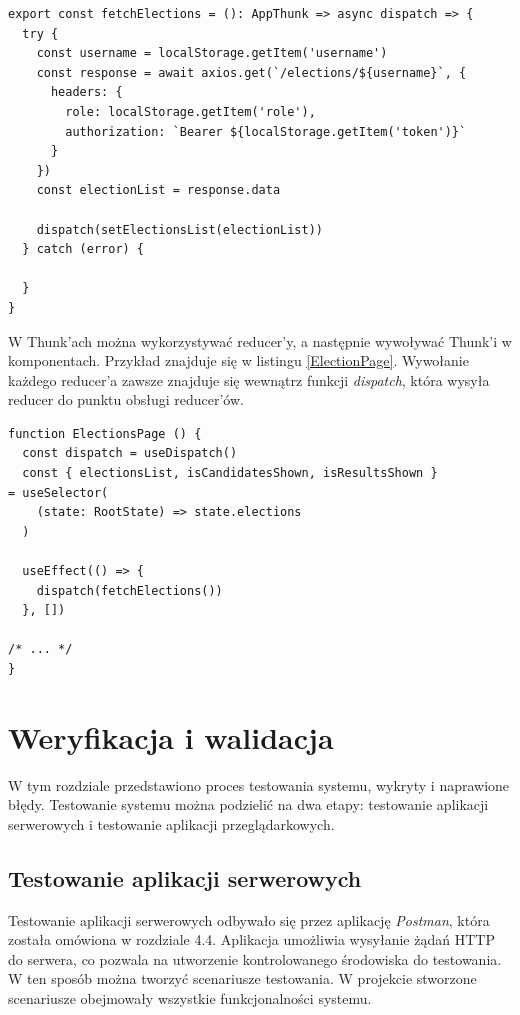\documentclass[a4paper,12pt]{book}
\begin{document}
\begin{lstlisting}[style=ES6, caption={Thunk \textit{fetchElection}.}, label={fetch}]
export const fetchElections = (): AppThunk => async dispatch => {
  try {
    const username = localStorage.getItem('username')
    const response = await axios.get(`/elections/${username}`, {
      headers: {
        role: localStorage.getItem('role'),
        authorization: `Bearer ${localStorage.getItem('token')}`
      }
    })
    const electionList = response.data

    dispatch(setElectionsList(electionList))
  } catch (error) {

  }
}
\end{lstlisting}

 W Thunk'ach można wykorzystywać reducer'y, a następnie wywoływać Thunk'i w komponentach. Przykład znajduje się w listingu \ref{ElectionPage}. Wywołanie każdego reducer'a zawsze znajduje się wewnątrz funkcji \textit{dispatch}, która wysyła reducer do punktu obsługi reducer'ów.

\begin{lstlisting}[style=ES6, caption={Wykorzystanie Thunk'a, w komponencie \textit{ElectionsPage}.}, label={ElectionPage}]
function ElectionsPage () {
  const dispatch = useDispatch()
  const { electionsList, isCandidatesShown, isResultsShown } 
= useSelector(
    (state: RootState) => state.elections
  )

  useEffect(() => {
    dispatch(fetchElections())
  }, [])

/* ... */
}
\end{lstlisting}

\chapter{Weryfikacja i walidacja}

W tym rozdziale przedstawiono proces testowania systemu, wykryty i naprawione błędy. Testowanie systemu można podzielić na dwa etapy: testowanie aplikacji serwerowych i testowanie aplikacji przeglądarkowych. 

\section{Testowanie aplikacji serwerowych}

Testowanie aplikacji serwerowych odbywało się przez aplikację \textit{Postman}, która została omówiona w rozdziale 4.4. Aplikacja umożliwia wysyłanie żądań HTTP do serwera, co pozwala na utworzenie kontrolowanego środowiska do testowania. W ten sposób można tworzyć scenariusze testowania. W projekcie stworzone scenariusze obejmowały wszystkie funkcjonalności systemu.
\end{document}
